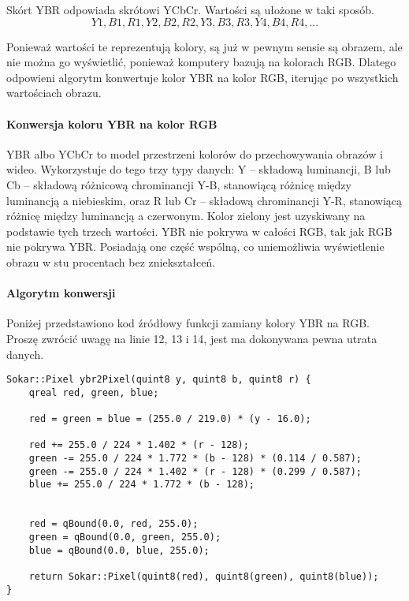 Skórt YBR odpowiada skrótowi YCbCr.
Wartości są ułożone w taki sposób.
\[Y1, B1, R1, Y2, B2, R2, Y3, B3, R3, Y4, B4, R4,  ...\]

Ponieważ wartości te reprezentują kolory, są już w pewnym sensie są obrazem, ale nie można go wyświetlić, ponieważ komputery bazują na kolorach RGB.
Dlatego odpowieni algorytm konwertuje kolor YBR na kolor RGB, iterując po wszystkich wartościach obrazu.

\paragraph*{Konwersja koloru YBR na kolor RGB}

YBR albo YCbCr to model przestrzeni kolorów do przechowywania obrazów i wideo.
Wykorzystuje do tego trzy typy danych: Y – składową luminancji, B lub Cb – składową różnicową chrominancji Y-B, stanowiącą różnicę między luminancją a niebieskim, oraz R lub Cr – składową chrominancji Y-R, stanowiącą różnicę między luminancją a czerwonym.
Kolor zielony jest uzyskiwany na podstawie tych trzech wartości.
YBR nie pokrywa w całości RGB, tak jak RGB nie pokrywa YBR.
Posiadają one część wspólną, co uniemożliwia wyświetlenie obrazu w stu procentach bez zniekształceń.

\paragraph*{Algorytm konwersji}

Poniżej przedstawiono kod źródłowy funkcji zamiany kolory YBR na RGB.
Proszę zwrócić uwagę na linie 12, 13 i 14, jest ma dokonywana pewna utrata danych.

\begin{lstlisting}
Sokar::Pixel ybr2Pixel(quint8 y, quint8 b, quint8 r) {
    qreal red, green, blue;

    red = green = blue = (255.0 / 219.0) * (y - 16.0);

    red += 255.0 / 224 * 1.402 * (r - 128);
    green -= 255.0 / 224 * 1.772 * (b - 128) * (0.114 / 0.587);
    green -= 255.0 / 224 * 1.402 * (r - 128) * (0.299 / 0.587);
    blue += 255.0 / 224 * 1.772 * (b - 128);


    red = qBound(0.0, red, 255.0);
    green = qBound(0.0, green, 255.0);
    blue = qBound(0.0, blue, 255.0);

    return Sokar::Pixel(quint8(red), quint8(green), quint8(blue));
}
\end{lstlisting}